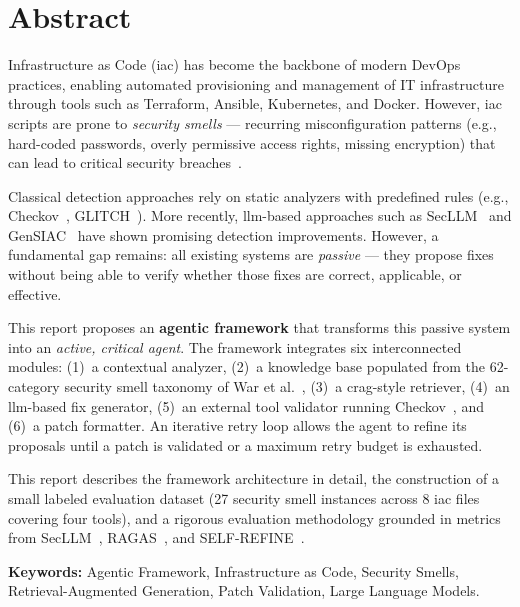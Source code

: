 \documentclass[12pt, a4paper]{report}
\begin{document}
\chapter*{Abstract}

Infrastructure as Code (\gls{iac}) has become the backbone of modern DevOps practices,
enabling automated provisioning and management of IT infrastructure through tools such as
Terraform, Ansible, Kubernetes, and Docker. However, \gls{iac} scripts are prone to
\emph{security smells} --- recurring misconfiguration patterns (e.g., hard-coded passwords,
overly permissive access rights, missing encryption) that can lead to critical security
breaches~\citep{rahman2019seven, war2025vulnerabilities}.

Classical detection approaches rely on static analyzers with predefined rules
(e.g., Checkov~\citep{checkov2024}, GLITCH~\citep{saavedra2022glitch}).
More recently, \gls{llm}-based approaches such as SecLLM~\citep{devito2025secllm}
and GenSIAC~\citep{li2025gensiac} have shown promising detection improvements.
However, a fundamental gap remains: all existing systems are \emph{passive} ---
they propose fixes without being able to verify whether those fixes are correct,
applicable, or effective.

This report proposes an \textbf{agentic framework} that transforms this passive system
into an \emph{active, critical agent}. The framework integrates six interconnected modules:
(1)~a contextual analyzer, (2)~a knowledge base populated from the 62-category security
smell taxonomy of War et al.~\citep{war2025taxonomy}, (3)~a \gls{crag}-style retriever,
(4)~an \gls{llm}-based fix generator, (5)~an external tool validator running
Checkov~\citep{checkov2024}, and (6)~a patch formatter. An iterative retry loop allows
the agent to refine its proposals until a patch is validated or a maximum retry budget
is exhausted.

This report describes the framework architecture in detail, the construction of a
small labeled evaluation dataset (27 security smell instances across 8 \gls{iac}
files covering four tools), and a rigorous evaluation methodology grounded in metrics
from SecLLM~\citep{devito2025secllm}, RAGAS~\citep{es2024ragas}, and
SELF-REFINE~\citep{madaan2023selfrefine}.

\bigskip
\noindent\textbf{Keywords:} Agentic Framework, Infrastructure as Code, Security Smells,
Retrieval-Augmented Generation, Patch Validation, Large Language Models.
\end{document}
